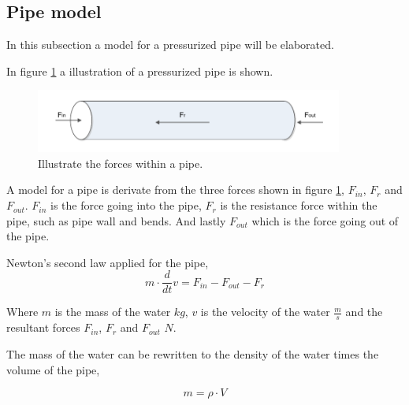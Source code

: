 
\subsection{Pipe model}\label{se:pipe_model}
In this subsection a model for a pressurized pipe will be elaborated. 

In figure \ref{fig:pipe_3d} a illustration of a pressurized pipe is shown.
\begin{figure}[H]
\centering
\includegraphics[width=0.9\textwidth]{report/modeling/pictures/pipe_3d.pdf}
\caption{Illustrate the forces within a pipe.}
\label{fig:pipe_3d}
\end{figure}


A model for a pipe is derivate from the three forces shown in figure \ref{fig:pipe_3d}, $F_{in}$, $F_r$ and $F_{out}$. $F_{in}$ is the force going into the pipe, $F_r$ is the resistance force within the pipe, such as pipe wall and bends. And lastly $F_{out}$ which is the force going out of the pipe. 

Newton's second law applied for the pipe, 
\begin{equation}\label{eq:pipe_newton}
m\cdot \frac{d}{dt}v = F_{in} - F_{out} - F_r 
\end{equation}

Where $m$ is the mass of the water $kg$, $v$ is the velocity of the water $\frac{m}{s}$ and the resultant forces $F_{in}$, $F_r$ and $F_{out}$ $N$.  

The mass of the water can be rewritten to the density of the water times the volume of the pipe,

\begin{equation}
m = \rho \cdot V 
\end{equation}

